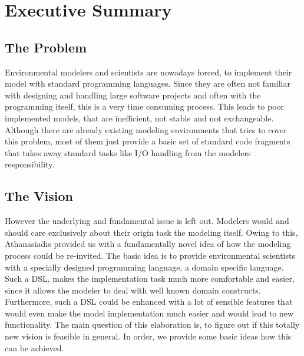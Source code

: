 \chapter*{Executive Summary}
\section*{The Problem}
\par
Environmental modelers and scientists are nowadays forced, to implement their model with standard programming languages. Since they are often not familiar with designing and handling large software projects and often with the programming itself, this is a very time consuming process. This leads to poor implemented models, that are inefficient, not stable and not exchangeable.
\\
Although there are already existing modeling environments that tries to cover this problem, most of them just provide a basic set of standard code fragments that takes away standard tasks like I/O handling from the modelers responsibility.

\section*{The Vision}
\par
However the underlying and fundamental issue is left out. Modelers would and should care exclusively about their origin task the modeling itself. Owing to this, Athanasiadis provided us with a fundamentally novel idea of how the modeling process could be re-invited. The basic idea is to provide environmental scientists with a specially designed programming language, a domain specific language. Such a DSL, makes the implementation task much more comfortable and easier, since it allows the modeler to deal with well known domain constructs. Furthermore, such a DSL could be enhanced with a lot of sensible features that would even make the model implementation much easier and would lead to new functionality. The main question of this elaboration is, to figure out if this totally new vision is feasible in general. In order, we provide some basic ideas how this can be achieved.

